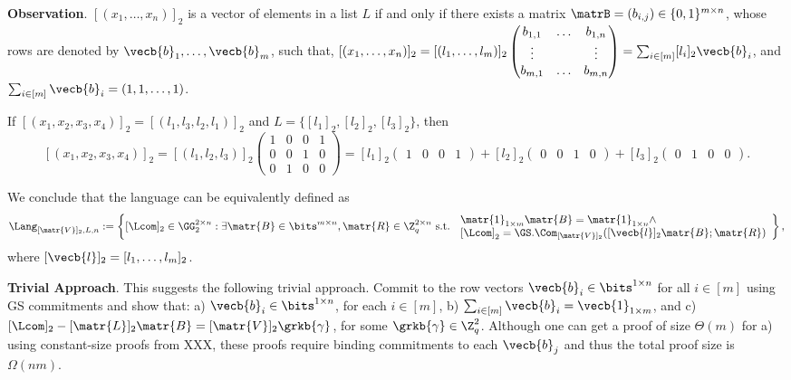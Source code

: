 \textbf{Observation}. $[(x_1,\ldots, x_n)]_2$ is a vector of elements in a list $L$ if and only if there exists a matrix 
$\matrB=(b_{i,j})\in \{0,1\}^{m \times n}$, whose rows are denoted by 
$\vecb{b}_1,\ldots,\vecb{b}_m$, such that, 
 $[(x_1,\ldots, x_n)]_2= [(l_1,\ldots, l_m)]_2 \begin{pmatrix} b_{1,1} & \ldots & b_{1,n} \\
\vdots & & \vdots  
\\
b_{m,1} & \ldots & b_{m,n}
\end{pmatrix} = \sum_{i \in [m]} [l_i]_2 \vecb{b}_i $, and $\sum_{i\in[m]}\vecb{b}_i=(1,1,\ldots,1)$. 

\begin{example} If  $[(x_1,x_2,x_3, x_4)]_2=
[(l_1,l_3,l_2,l_1)]_2$ and $L=\{[l_1]_2,[l_2]_2,[l_3]_2\}$, then 
$$[(x_1,x_2,x_3, x_4)]_2 = [(l_1,l_2,l_3)]_2\begin{pmatrix} 1 & 0 & 0 & 1\\
	0 & 0 & 1 & 0\\
	0 & 1 & 0 & 0
\end{pmatrix}= [l_1]_2 \begin{pmatrix} 1 & 0 & 0 & 1
\end{pmatrix} + [l_2]_2  \begin{pmatrix} 0 & 0 & 1 & 0
\end{pmatrix} + [l_3]_2 \begin{pmatrix} 0 & 1 & 0 & 0
\end{pmatrix}.$$

\end{example} 

We conclude that the language can be equivalently defined as
$$
\Lang_{[\matr{V}]_2,L,n}:=\left\{[\Lcom]_2\in\GG_2^{2\times n}:\exists\matr{B}\in\bits^{m\times n},\matr{R}\in\Z_q^{2\times n} \text{ s.t. }
    \begin{array}{l}
    \matr{1}_{1\times m}\matr{B}=\matr{1}_{1\times n}\wedge\\
    {[\Lcom]}_2=\GS.\Com_{[\matr{V}]_2}([\vecb{l}]_2\matr{B};\matr{R})
    \end{array}
    \right\},
$$
where $[\vecb{l}]_2=[l_1,\ldots, l_m]_2$.

\textbf{Trivial Approach}.  This suggests the following trivial approach. Commit to the row vectors $\vecb{b}_i\in\bits^{1\times n}$ for all $i\in[m]$ using GS commitments and show that: a) $\vecb{b}_i\in\bits^{1\times n}$, for each $i\in[m]$, b) $\sum_{i\in[m]}\vecb{b}_i=\vecb{1}_{1\times m}$, and c) $[\Lcom]_2-[\matr{L}]_2\matr{B}=[\matr{V}]_2\grkb{\gamma}$, for some $\grkb{\gamma}\in\Z_q^2$. Although one can get a proof of size $\Theta(m)$ for a) using constant-size proofs from XXX, these proofs require binding commitments to each $\vecb{b}_j$ and thus the total proof size is $\Omega(nm)$.


